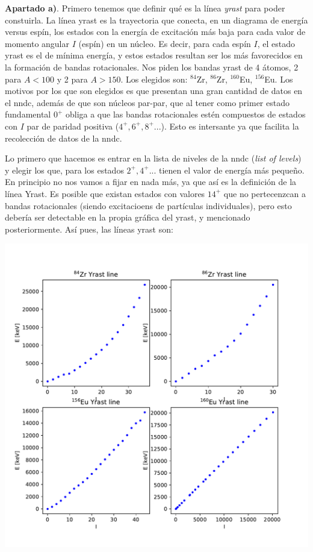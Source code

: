     \textbf{Apartado a)}.  Primero tenemos que definir qué es la línea \textit{yrast} para poder constuirla. La línea yrast es la trayectoria que conecta, en un diagrama de energía versus espín, los estados con la energía de excitación más baja para cada valor de momento angular $I$ (espín) en un núcleo. Es decir, para cada espín $I$, el estado yrast es el de mínima energía, y estos estados resultan ser los más favorecidos en la formación de bandas rotacionales. Nos piden los bandas yrast de 4 átomos, 2 para $A<100$ y 2 para $A>150$. Los elegidos son: $^{84}$Zr, $^{86}$Zr, $^{160}$Eu, $^{156}$Eu. Los motivos por los que son elegidos es que presentan una gran cantidad de datos en el nndc, además de que son núcleos par-par, que al tener como primer estado fundamental $0^+$ obliga a que las bandas rotacionales estén compuestos de estados con $I$ par de paridad positiva ($4^+,6^+,8^+...$). Esto es intersante ya que facilita la recolección de datos de la nndc.

    Lo primero que hacemos es entrar en la lista de niveles de la nndc (\textit{list of levels}) y elegir los que, para los estados $2^+,4^+...$ tienen el valor de energía más pequeño. En principio no nos vamos a fijar en nada más, ya que así es la definición de la línea Yrast. Es posible que existan estados con valores $14^+$ que no pertecenzcan a bandas rotacionales (siendo excitacioens de partículas individuales), pero esto debería ser detectable en la propia gráfica del yrast, y mencionado posteriormente. Así pues, las líneas yrast son:

    \begin{center}
        \includegraphics[width=0.8\linewidth]{Cuerpo/Boletin_01/Yrast_total.pdf}
    \end{center}

